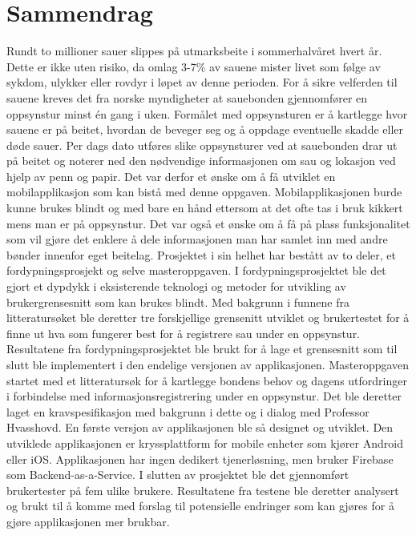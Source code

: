 \chapter*{Sammendrag}
Rundt to millioner sauer slippes på utmarksbeite i sommerhalvåret hvert år. Dette er ikke uten risiko, da omlag 3-7\% av sauene mister livet som følge av sykdom, ulykker eller rovdyr i løpet av denne perioden. For å sikre velferden til sauene kreves det fra norske myndigheter at sauebonden gjennomfører en oppsynstur minst én gang i uken. Formålet med oppsynsturen er å kartlegge hvor sauene er på beitet, hvordan de beveger seg og å oppdage eventuelle skadde eller døde sauer. Per dags dato utføres slike oppsynsturer ved at sauebonden drar ut på beitet og noterer ned den nødvendige informasjonen om sau og lokasjon ved hjelp av penn og papir. Det var derfor et ønske om å få utviklet en mobilapplikasjon som kan bistå med denne oppgaven. Mobilapplikasjonen burde kunne brukes blindt og med bare en hånd ettersom at det ofte tas i bruk kikkert mens man er på oppsynstur. Det var også et ønske om å få på plass funksjonalitet som vil gjøre det enklere å dele informasjonen man har samlet inn med andre bønder innenfor eget beitelag. 
\newline
\newline
Prosjektet i sin helhet har bestått av to deler, et fordypningsprosjekt og selve masteroppgaven. I fordypningsprosjektet ble det gjort et dypdykk i eksisterende teknologi og metoder for utvikling av brukergrensesnitt som kan brukes blindt. Med bakgrunn i funnene fra litteratursøket ble deretter tre forskjellige grensenitt utviklet og brukertestet for å finne ut hva som fungerer best for å registrere sau under en oppsynstur. Resultatene fra fordypningsprosjektet ble brukt for å lage et grensesnitt som til slutt ble implementert i den endelige versjonen av applikasjonen.
\newline
\newline
Masteroppgaven startet med et litteratursøk for å kartlegge bondens behov og dagens utfordringer i forbindelse med informasjonsregistrering under en oppsynstur. Det ble deretter laget en kravspesifikasjon med bakgrunn i dette og i dialog med Professor Hvasshovd. En første versjon av applikasjonen ble så designet og utviklet. Den utviklede applikasjonen er kryssplattform for mobile enheter som kjører Android eller iOS. Applikasjonen har ingen dedikert tjenerløsning, men bruker Firebase som Backend-as-a-Service. I slutten av prosjektet ble det gjennomført brukertester på fem ulike brukere. Resultatene fra testene ble deretter analysert og brukt til å komme med forslag til potensielle endringer som kan gjøres for å gjøre applikasjonen mer brukbar.

